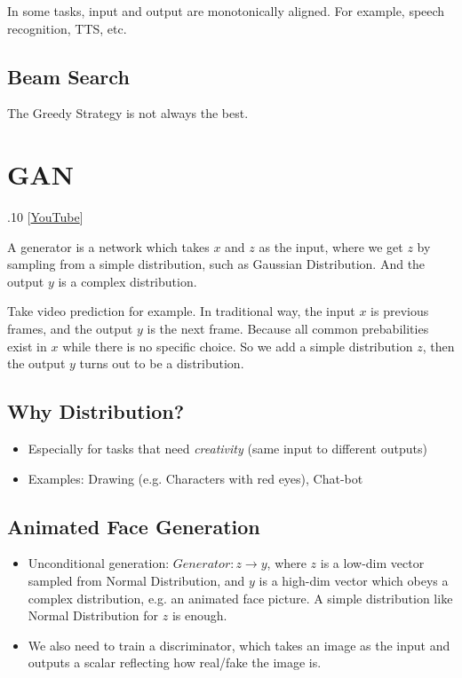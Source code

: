 \documentclass[11pt]{book}
\begin{document}
In some tasks, input and output are monotonically aligned. For example, speech recognition, TTS, etc.

\section{Beam Search}
The Greedy Strategy is not always the best.

\chapter{GAN}
.10 [\href{https://www.youtube.com/watch?v=4OWp0wDu6Xw&list=PLJV_el3uVTsMhtt7_Y6sgTHGHp1Vb2P2J&index=14}{YouTube}]

A generator is a network which takes $x$ and $z$ as the input, where we get $z$ by sampling from a simple distribution, such as Gaussian Distribution. And the output $y$ is a complex distribution.

Take video prediction for example. In traditional way, the input $x$ is previous frames, and the output $y$ is the next frame. Because all common prebabilities exist in $x$ while there is no specific choice. So we add a simple distribution $z$, then the output $y$ turns out to be a distribution.

\section{Why Distribution?}
\begin{itemize}
    \item Especially for tasks that need \textit{creativity} (same input to different outputs)
    \item Examples: Drawing (e.g. Characters with red eyes), Chat-bot
\end{itemize}

\section{Animated Face Generation}
\begin{itemize}
    \item Unconditional generation: $Generator:z\to y$, where $z$ is a low-dim vector sampled from Normal Distribution, and $y$ is a high-dim vector which obeys a complex distribution, e.g. an animated face picture. A simple distribution like Normal Distribution for $z$ is enough.
    \item We also need to train a discriminator, which takes an image as the input and outputs a scalar reflecting how real/fake the image is.
\end{itemize}
\end{document}
